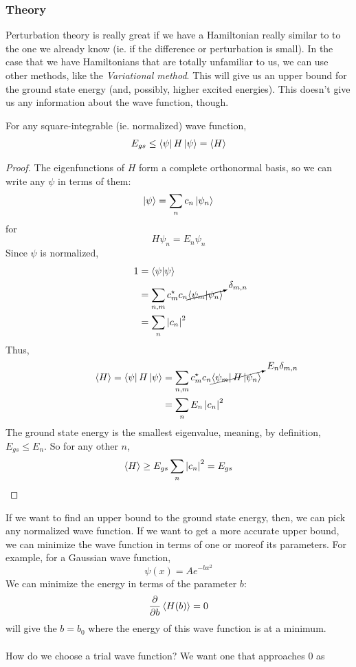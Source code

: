 \documentclass[a4paper]{article}
\begin{document}
\subsubsection{Theory}
Perturbation theory is really great if we have a Hamiltonian really similar to
to the one we already know (ie. if the difference or perturbation is small).
In the case that we have Hamiltonians that are totally unfamiliar to us,
we can use other methods, like the \emph{Variational method}. This will
give us an upper bound for the ground state energy (and, possibly,
higher excited energies). This doesn't give us any information about the wave
function, though.
\begin{prop}
	For any square-integrable (ie. normalized) wave function,
	\[ E_{gs} \leq \left\langle \psi \right\rvert H\left\lvert \psi\right\rangle = \left\langle H\right\rangle \]
\begin{proof}
	The eigenfunctions of $H$ form a complete orthonormal basis, so we
	can write any $\psi$ in terms of them:
	\[ \left\lvert \psi\right\rangle = \sum_n c_n\left\lvert \psi_n\right\rangle \]
	for
	\[ H\psi_n = E_n\psi_n \]
	Since $\psi$ is normalized,
	\begin{align*}
		1 &= \left\langle \psi\middle\vert \psi \right\rangle\\
		  &= \sum_{n,m}c_m^\star c_n
			\cancelto{\delta_{m,n}}{\left\langle \psi_m\middle\vert \psi_n \right\rangle}\\
		&= \sum_n \left\lvert c_n\right\rvert^2
	\end{align*}
	Thus,
	\begin{align*}
		\left\langle H\right\rangle =
		\left\langle \psi \right\rvert H\left\lvert \psi\right\rangle &= \sum_{n,m} c_m^\star c_n
		\cancelto{E_n\delta_{m,n}}{\left\langle \psi_m \right\rvert H\left\lvert \psi_n\right\rangle}\\
		&= \sum_n E_n\left\lvert c_n\right\rvert^2
	\end{align*}
	The ground state energy is the smallest eigenvalue, meaning, by
	definition, $E_{gs} \leq E_n$. So for any other $n$,
	\[
		\left\langle H\right\rangle \geq E_{gs}\sum_n\left\lvert c_n\right\rvert^2 = E_{gs}
	\]
\end{proof}
\end{prop}
If we want to find an upper bound to the ground state energy, then, we can
pick any normalized wave function. If we want to get a more accurate upper
bound, we can minimize the wave function in terms of one or moreof its
parameters. For example, for a Gaussian wave function,
\[ \psi(x) = Ae^{-bx^2} \]
We can minimize the energy in terms of the parameter $b$:
\[ \pd{b}\exval{H(b)} = 0 \]
will give the $b = b_0$ where the energy of this wave function is at a minimum.
\\~\\
How do we choose a trial wave function? We want one that approaches 0 as
\end{document}
